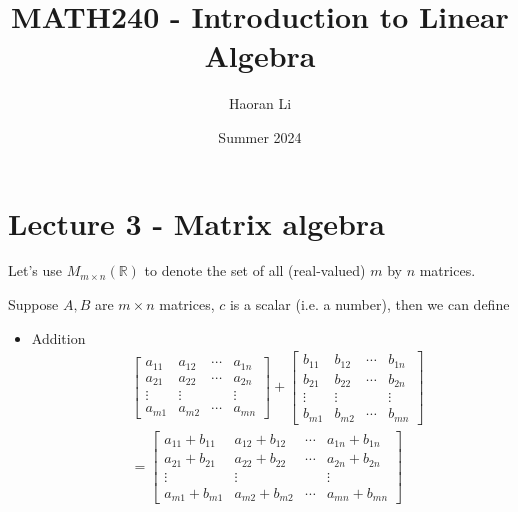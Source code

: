 \documentclass{beamer}
\title{MATH240 - Introduction to Linear Algebra}
\author{Haoran Li}
\institute[UMD]{University of Maryland, College Park}
\date{Summer 2024}
\theoremstyle{definition}
\theoremstyle{remark}
\begin{document}
\maketitle

\section{Lecture 3 - Matrix algebra}

\begin{frame}[t]
\begin{definition}
Let's use $M_{m\times n}(\mathbb R)$ to denote the set of all (real-valued) $m$ by $n$ matrices.
\end{definition}
\pause
\begin{definition}
Suppose $A,B$ are $m\times n$ matrices, $c$ is a scalar (i.e. a number), then we can define\pause
\begin{itemize}
\item Addition
\begin{align*}
&\begin{bmatrix}
a_{11}&a_{12}&\cdots&a_{1n}\\
a_{21}&a_{22}&\cdots&a_{2n}\\
\vdots&\vdots&&\vdots\\
a_{m1}&a_{m2}&\cdots&a_{mn}
\end{bmatrix}+\begin{bmatrix}
b_{11}&b_{12}&\cdots&b_{1n}\\
b_{21}&b_{22}&\cdots&b_{2n}\\
\vdots&\vdots&&\vdots\\
b_{m1}&b_{m2}&\cdots&b_{mn}
\end{bmatrix}\\
&=\begin{bmatrix}
a_{11}+b_{11}&a_{12}+b_{12}&\cdots&a_{1n}+b_{1n}\\
a_{21}+b_{21}&a_{22}+b_{22}&\cdots&a_{2n}+b_{2n}\\
\vdots&\vdots&&\vdots\\
a_{m1}+b_{m1}&a_{m2}+b_{m2}&\cdots&a_{mn}+b_{mn}
\end{bmatrix}
\end{align*}
\end{itemize}
\end{definition}
\end{frame}
\end{document}

